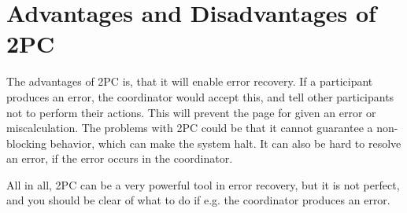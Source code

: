 \section{Advantages and Disadvantages of 2PC}
The advantages of 2PC is, that it will enable error recovery. If a participant produces an error, the coordinator would accept this, and tell other participants not to perform their actions. This will prevent the page for given an error or miscalculation.
The problems with 2PC could be that it cannot guarantee a non-blocking behavior, which can make the system halt. It can also be hard to resolve an error, if the error occurs in the coordinator.

All in all, 2PC can be a very powerful tool in error recovery, but it is not perfect, and you should be clear of what to do if e.g. the coordinator produces an error.